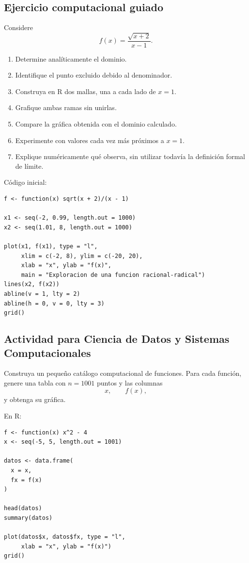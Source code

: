\documentclass[12pt]{article}
\theoremstyle{remark}
\begin{document}
\subsection*{Ejercicio computacional guiado}

Considere
\[
f(x)=\frac{\sqrt{x+2}}{x-1}.
\]

\begin{enumerate}
    \item Determine analíticamente el dominio.
    \item Identifique el punto excluido debido al denominador.
    \item Construya en R dos mallas, una a cada lado de $x=1$.
    \item Grafique ambas ramas sin unirlas.
    \item Compare la gráfica obtenida con el dominio calculado.
    \item Experimente con valores cada vez más próximos a $x=1$.
    \item Explique numéricamente qué observa, sin utilizar todavía la definición
    formal de límite.
\end{enumerate}

Código inicial:

\begin{verbatim}
f <- function(x) sqrt(x + 2)/(x - 1)

x1 <- seq(-2, 0.99, length.out = 1000)
x2 <- seq(1.01, 8, length.out = 1000)

plot(x1, f(x1), type = "l",
     xlim = c(-2, 8), ylim = c(-20, 20),
     xlab = "x", ylab = "f(x)",
     main = "Exploracion de una funcion racional-radical")
lines(x2, f(x2))
abline(v = 1, lty = 2)
abline(h = 0, v = 0, lty = 3)
grid()
\end{verbatim}

\subsection*{Actividad para Ciencia de Datos y Sistemas Computacionales}

Construya un pequeño catálogo computacional de funciones. Para cada función,
genere una tabla con $n=1001$ puntos y las columnas
\[
x,\qquad f(x),
\]
y obtenga su gráfica.

En R:

\begin{verbatim}
f <- function(x) x^2 - 4
x <- seq(-5, 5, length.out = 1001)

datos <- data.frame(
  x = x,
  fx = f(x)
)

head(datos)
summary(datos)

plot(datos$x, datos$fx, type = "l",
     xlab = "x", ylab = "f(x)")
grid()
\end{verbatim}
\end{document}
